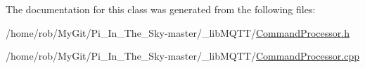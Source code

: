 The documentation for this class was generated from the following files\+:\begin{DoxyCompactItemize}
\item 
/home/rob/\+My\+Git/\+Pi\+\_\+\+In\+\_\+\+The\+\_\+\+Sky-\/master/\+\_\+lib\+M\+Q\+T\+T/\hyperlink{_command_processor_8h}{Command\+Processor.\+h}\item 
/home/rob/\+My\+Git/\+Pi\+\_\+\+In\+\_\+\+The\+\_\+\+Sky-\/master/\+\_\+lib\+M\+Q\+T\+T/\hyperlink{_command_processor_8cpp}{Command\+Processor.\+cpp}\end{DoxyCompactItemize}
